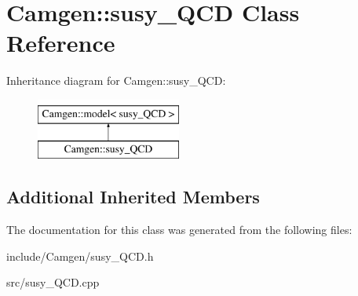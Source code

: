 \hypertarget{a00528}{}\section{Camgen\+:\+:susy\+\_\+\+Q\+C\+D Class Reference}
\label{a00528}
Inheritance diagram for Camgen\+:\+:susy\+\_\+\+Q\+C\+D\+:\begin{figure}[H]
\begin{center}
\leavevmode
\includegraphics[height=2.000000cm]{a00528}
\end{center}
\end{figure}
\subsection*{Additional Inherited Members}


The documentation for this class was generated from the following files\+:\begin{DoxyCompactItemize}
\item 
include/\+Camgen/susy\+\_\+\+Q\+C\+D.\+h\item 
src/susy\+\_\+\+Q\+C\+D.\+cpp\end{DoxyCompactItemize}
